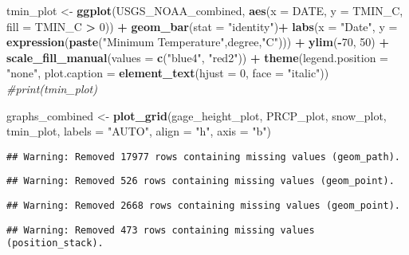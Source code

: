 \documentclass[]{article}
\newenvironment{Shaded}{\begin{snugshade}}{\end{snugshade}}
\newcommand{\CommentTok}[1]{\textcolor[rgb]{0.56,0.35,0.01}{\textit{#1}}}
\newcommand{\DataTypeTok}[1]{\textcolor[rgb]{0.13,0.29,0.53}{#1}}
\newcommand{\DecValTok}[1]{\textcolor[rgb]{0.00,0.00,0.81}{#1}}
\newcommand{\KeywordTok}[1]{\textcolor[rgb]{0.13,0.29,0.53}{\textbf{#1}}}
\newcommand{\NormalTok}[1]{#1}
\newcommand{\OperatorTok}[1]{\textcolor[rgb]{0.81,0.36,0.00}{\textbf{#1}}}
\newcommand{\StringTok}[1]{\textcolor[rgb]{0.31,0.60,0.02}{#1}}
\begin{document}
\begin{Shaded}
\begin{Highlighting}[]
\NormalTok{tmin_plot <-}\StringTok{ }\KeywordTok{ggplot}\NormalTok{(USGS_NOAA_combined, }\KeywordTok{aes}\NormalTok{(}\DataTypeTok{x =}\NormalTok{ DATE, }\DataTypeTok{y =}\NormalTok{ TMIN_C, }\DataTypeTok{fill =}\NormalTok{ TMIN_C }\OperatorTok{>}\StringTok{ }\DecValTok{0}\NormalTok{)) }\OperatorTok{+}
\StringTok{  }\KeywordTok{geom_bar}\NormalTok{(}\DataTypeTok{stat =} \StringTok{"identity"}\NormalTok{)}\OperatorTok{+}
\StringTok{  }\KeywordTok{labs}\NormalTok{(}\DataTypeTok{x =} \StringTok{"Date"}\NormalTok{, }\DataTypeTok{y =} \KeywordTok{expression}\NormalTok{(}\KeywordTok{paste}\NormalTok{(}\StringTok{"Minimum Temperature"}\NormalTok{,degree,}\StringTok{"C"}\NormalTok{))) }\OperatorTok{+}
\StringTok{  }\KeywordTok{ylim}\NormalTok{(}\OperatorTok{-}\DecValTok{70}\NormalTok{, }\DecValTok{50}\NormalTok{) }\OperatorTok{+}
\StringTok{  }\KeywordTok{scale_fill_manual}\NormalTok{(}\DataTypeTok{values =} \KeywordTok{c}\NormalTok{(}\StringTok{"blue4"}\NormalTok{, }\StringTok{"red2"}\NormalTok{)) }\OperatorTok{+}
\StringTok{  }\KeywordTok{theme}\NormalTok{(}\DataTypeTok{legend.position =} \StringTok{"none"}\NormalTok{,}
        \DataTypeTok{plot.caption =} \KeywordTok{element_text}\NormalTok{(}\DataTypeTok{hjust =} \DecValTok{0}\NormalTok{, }\DataTypeTok{face =} \StringTok{"italic"}\NormalTok{))}
\CommentTok{#print(tmin_plot)}

\NormalTok{graphs_combined <-}\StringTok{ }\KeywordTok{plot_grid}\NormalTok{(gage_height_plot, PRCP_plot, snow_plot, tmin_plot, }
                             \DataTypeTok{labels =} \StringTok{"AUTO"}\NormalTok{,}
                             \DataTypeTok{align =} \StringTok{"h"}\NormalTok{,}
                             \DataTypeTok{axis =} \StringTok{"b"}\NormalTok{)}
\end{Highlighting}
\end{Shaded}

\begin{verbatim}
## Warning: Removed 17977 rows containing missing values (geom_path).
\end{verbatim}

\begin{verbatim}
## Warning: Removed 526 rows containing missing values (geom_point).
\end{verbatim}

\begin{verbatim}
## Warning: Removed 2668 rows containing missing values (geom_point).
\end{verbatim}

\begin{verbatim}
## Warning: Removed 473 rows containing missing values (position_stack).
\end{verbatim}
\end{document}
